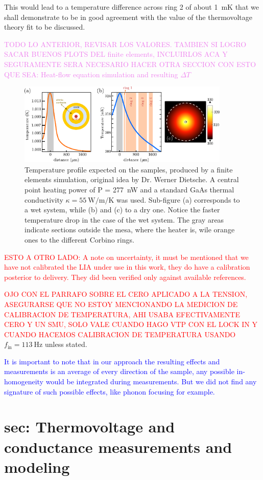 This would lead to a temperature difference across ring 2 of about \SI{1}{\milli\kelvin} that we shall demonstrate to be in good agreement with the value of the thermovoltage theory fit to be discussed. 

\textcolor{violet}{TODO LO ANTERIOR, REVISAR LOS VALORES. TAMBIEN SI LOGRO SACAR BUENOS PLOTS DEL finite elements, INCLUIRLOS ACA Y SEGURAMENTE SERA NECESARIO HACER OTRA SECCION CON ESTO QUE SEA: Heat-flow equation simulation and resulting $\Delta T$}

\begin{figure}
    \centering
    \includegraphics[width=0.9\textwidth]{figures/temperature_corbino/comsol_helium_dry_and_wet.pdf}
    \caption{Temperature profile expected on the samples, produced by a finite elements simulation, original idea by Dr. Werner Dietsche. A central point heating power of P = \SI{277}{\nano\watt} and a standard GaAs thermal conductivity $\kappa = \SI{55}{\watt\per\meter\per\kelvin}$\cite{gaasMTPrus, carlson1965thermal} was used. Sub-figure (a) corresponds to a wet system, while (b) and (c) to a dry one. Notice the faster temperature drop in the case of the wet system. The gray areas indicate sections outside the mesa, where the heater is, wile orange ones to the different Corbino rings. }
    \label{fig:finite elementsDryWet}
\end{figure}


\textcolor{red}{ESTO A OTRO LADO: A note on uncertainty, it must be mentioned that we have not calibrated the LIA under use in this work, they do have a calibration posterior to delivery. They did been verified only against available references.}

\textcolor{red}{OJO CON EL PARRAFO SOBRE EL CERO APLICADO A LA TENSION, ASEGURARSE QUE NO ESTOY MENCIONANDO LA MEDICION DE CALIBRACION DE TEMPERATURA, AHI USABA EFECTIVAMENTE CERO Y UN SMU, SOLO VALE CUANDO HAGO VTP CON EL LOCK IN Y CUANDO HACEMOS CALIBRACION DE TEMPERATURA USANDO }
$f_{\mathrm{in}}= \SI{113}{\hertz}$ unless stated. 





\textcolor{blue}{It is important to note that in our approach the resulting effects and measurements is an average of every direction of the sample, any possible in-homogeneity would be integrated during measurements. But we did not find any signature of such possible effects, like phonon focusing for example.}


\section{sec: Thermovoltage and conductance measurements and modeling}
\label{sec:vtp_g_model}
